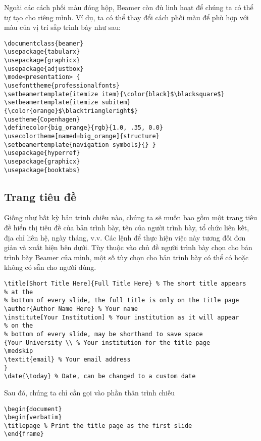 \documentclass[a4paper,UKenglish,cleveref, autoref, thm-restate]{lipics-v2021}
\begin{document}
Ngoài các cách phối màu đóng hộp, Beamer còn đủ linh hoạt để chúng ta có thể tự tạo cho riêng mình. Ví dụ, ta có thể thay đổi cách phối màu để phù hợp với màu của vị trí sắp trình bày như sau:
\begin{lstlisting}
\documentclass{beamer}
\usepackage{tabularx}
\usepackage{graphicx}
\usepackage{adjustbox}
\mode<presentation> {
\usefonttheme{professionalfonts}
\setbeamertemplate{itemize item}{\color{black}$\blacksquare$}
\setbeamertemplate{itemize subitem}{\color{orange}$\blacktriangleright$}
\usetheme{Copenhagen}
\definecolor{big_orange}{rgb}{1.0, .35, 0.0}
\usecolortheme[named=big_orange]{structure}
\setbeamertemplate{navigation symbols}{} }
\usepackage{hyperref}
\usepackage{graphicx}
\usepackage{booktabs}

\end{lstlisting}

\subsection{Trang tiêu đề}

Giống như bất kỳ bản trình chiếu nào, chúng ta sẽ muốn bao gồm một trang tiêu đề hiển thị tiêu đề của bản trình bày, tên của người trình bày, tổ chức liên kết, địa chỉ liên hệ, ngày tháng, v.v. Các lệnh để thực hiện việc này tương đối đơn giản và xuất hiện bên dưới. Tùy thuộc vào chủ đề người trình bày chọn cho bản trình bày Beamer của mình, một số tùy chọn cho bản trình bày có thể có hoặc không có sẵn cho người dùng.

\begin{lstlisting}
\title[Short Title Here]{Full Title Here} % The short title appears 
% at the
% bottom of every slide, the full title is only on the title page
\author{Author Name Here} % Your name
\institute[Your Institution] % Your institution as it will appear 
% on the
% bottom of every slide, may be shorthand to save space
{Your University \\ % Your institution for the title page
\medskip
\textit{email} % Your email address
}
\date{\today} % Date, can be changed to a custom date
\end{lstlisting}

Sau đó, chúng ta chỉ cần gọi vào phần thân trình chiếu
\begin{lstlisting}
\begin{document}
\begin{verbatim}
\titlepage % Print the title page as the first slide
\end{frame}
\end{lstlisting}
\end{document}
